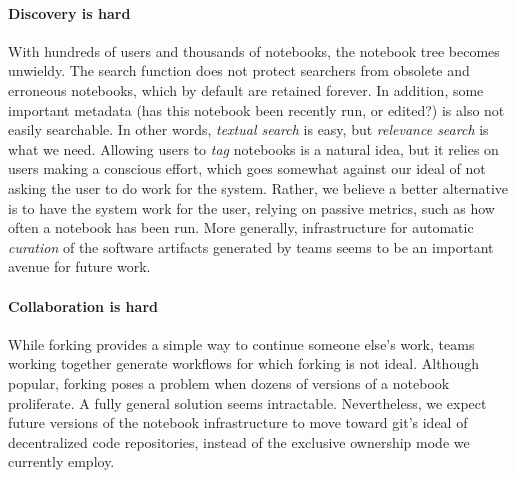 
\paragraph*{Discovery is hard} 
With hundreds of users and thousands of notebooks, the notebook tree
becomes unwieldy. The search function does not protect searchers from
obsolete and erroneous notebooks, which by default are retained
forever.  In addition, some important metadata (has this notebook been
recently run, or edited?) is also not easily searchable. In other words,
\emph{textual search} is easy, but \emph{relevance search} is what we
need. Allowing users to \emph{tag} notebooks is a natural idea, but it
relies on users making a conscious effort, which goes somewhat against
our ideal of not asking the user to do work for the system. Rather, we
believe a better alternative is to have the system work for the user,
relying on passive metrics, such as how often a notebook has been run.
More generally, infrastructure for automatic \emph{curation} of the
software artifacts generated by teams seems to be an important avenue
for future work.

\paragraph*{Collaboration is hard}
While forking provides a simple way to continue someone else's work,
teams working together generate workflows for which forking is not
ideal.  Although popular, forking poses a problem when dozens of
versions of a notebook proliferate. A fully general solution seems
intractable. Nevertheless, we expect future versions of the
notebook infrastructure to move toward git's ideal of decentralized
code repositories, instead of the exclusive ownership mode we
currently employ.
